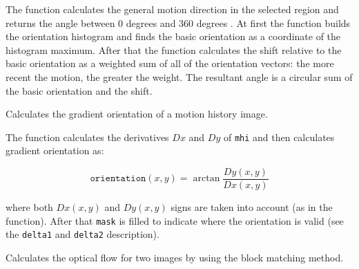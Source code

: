 The function calculates the general
motion direction in the selected region and returns the angle between
0 degrees  and 360 degrees . At first the function builds the orientation histogram
and finds the basic orientation as a coordinate of the histogram
maximum. After that the function calculates the shift relative to the
basic orientation as a weighted sum of all of the orientation vectors: the more
recent the motion, the greater the weight. The resultant angle is
a circular sum of the basic orientation and the shift.

Calculates the gradient orientation of a motion history image.


\begin{description}
\end{description}

The function calculates the derivatives $Dx$ and $Dy$ of \texttt{mhi} and then calculates gradient orientation as:

\[
\texttt{orientation}(x,y)=\arctan{\frac{Dy(x,y)}{Dx(x,y)}}
\]

where both $Dx(x,y)$ and $Dy(x,y)$ signs are taken into account (as in the  function). After that \texttt{mask} is filled to indicate where the orientation is valid (see the \texttt{delta1} and \texttt{delta2} description).

Calculates the optical flow for two images by using the block matching method.

